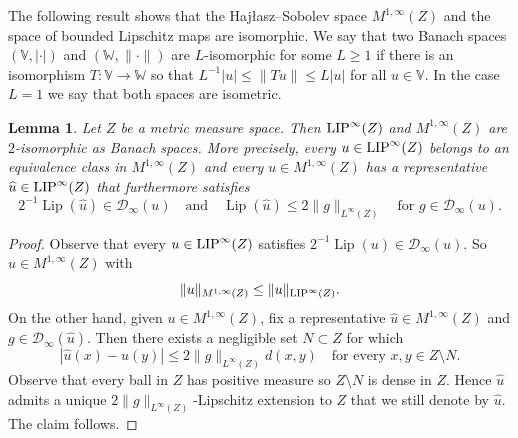 \documentclass[reqno]{amsart}
\newcommand{\LIP}{{\rm LIP}}
\numberwithin{equation}{section}
\newtheorem{lemma}[theorem]{Lemma}
\theoremstyle{remark}
\DeclareMathOperator{\lip}{Lip}
\begin{document}
The following result shows that the Haj\l{}asz--Sobolev space $M^{1, \infty}(Z)$ and the space of bounded Lipschitz maps are isomorphic.  We say that two Banach spaces $(\mathbb V,|\cdot|)$ and $(\mathbb W,\|\cdot\|)$ are $L$-isomorphic for some $L\geq 1$ if there is an isomorphism $T\colon\mathbb V\to\mathbb W$ so that $L^{-1}|u|\leq \|Tu\|\leq L|u|$
for all $u\in \mathbb V$. In the case $L=1$ we say that both spaces are isometric. 
\begin{lemma}\label{lemm:Lip:Haj}
Let $Z$ be a metric measure space. Then $\LIP^{\infty}( Z )$ and $M^{1,\infty}( Z ) $ are $2$-isomorphic as Banach spaces. More precisely, every $u\in \LIP^{\infty}(Z)$ belongs to an equivalence class in $M^{1,\infty}(Z)$ and every $u\in M^{1,\infty}(Z)$ has a representative $\widehat u\in \LIP^{\infty}(Z) $ that furthermore satisfies
\begin{equation*}
    2^{-1}\lip( \widehat{u} ) \in \mathcal{D}_{\infty}(u)
    \quad\text{and}\quad
    \lip( \widehat{u} )
    \leq
    2\|g\|_{ L^{\infty}(Z) }
    \quad\text{for $g \in \mathcal{D}_\infty(u)$.}
\end{equation*}
\end{lemma}
\begin{proof}
Observe that every $u\in \LIP^{\infty}( Z )$ satisfies $2^{-1}\lip(u) \in \mathcal{D}_{\infty}(  u )$. So  $u\in M^{1,\infty}( Z )$ with 
$$ \| u \|_{ M^{1,\infty}( Z ) }\leq\|  u \|_{ \LIP^{\infty}( Z ) }.$$ On the other hand, given $u\in M^{1,\infty}( Z ) $, fix a representative $\widehat u \in M^{1,\infty}(Z )$ and $g \in \mathcal{D}_{\infty}( \widehat u )$. Then there exists a negligible set $N \subset Z$ for which
\begin{equation*}
    | \widehat u(x) - \widehat u(y) |
    \leq
    2 \| g \|_{L^{\infty}(Z)} d(x,y)
    \quad\text{for every $x, y \in Z \setminus N$}.
\end{equation*}
Observe that every ball in $Z$ has positive measure so $Z \setminus N$ is dense in $Z$. Hence $\widehat u$ admits a unique $2\|g\|_{ L^{\infty}(Z) }$-Lipschitz extension to $Z$ that we still denote by $\widehat{u}$. The claim follows.
\end{proof}
\end{document}
